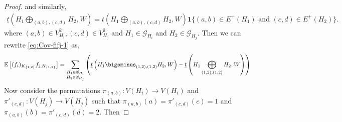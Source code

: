 \documentclass[11pt,reqno]{amsart}
\numberwithin{equation}{section}
\theoremstyle{definition}
\begin{document}
\begin{proof}
and similarly, 
\begin{align*}
\underline{t}\left(H_{1}\bigoplus_{(a,b),(c,d)} H_{2},W\right) = 
t\left(H_{1}\bigoplus_{(a,b),(c,d)} H_{2},W \right) \bm 1\{(a,b) \in E^{+}(H_{1}) \text{ and }(c,d) \in E^{+}(H_{2})\} .
\end{align*}
where $(a,b)\in V_{H_{i}}^{2}, (c,d)\in V_{H_{j}}^{2}$ and $H_{1}\in \mathscr{G}_{H_{i}}$ and $H_{2}\in \mathscr{G}_{H_{j}}$. Then we can rewrite \eqref{eq:Cov-fifj-1} as,
\begin{align}\label{eq:Cov-lowbar}
    \mathbb{E}
    &\left[(f_{i})_{K_{\{1,2\}}}f_{j,K_{\{1,2\}}}\right] = \sum_{\substack{H_{1}\in\mathscr{G}_{H_{i}}\\ H_{2}\in\mathscr{G}_{H_{j}}}}\left(\underline{t}\left(H_{1}\bigominus_{(1,2),(1,2)}H_{2},W\right) - \underline{t}\left(H_{1}\bigoplus_{(1,2),(1,2)}H_{2},W\right)\right)
\end{align}
Now consider the permutations $\pi_{(a, b)}:V(H_{i})\rightarrow V(H_{i})$ and  $\pi'_{(c, d)}:V(H_{j})\rightarrow V(H_{j})$ such that $\pi_{(a, b)}(a) = \pi'_{(c, d)}(c) = 1$ and $\pi_{(a, b)}(b) = \pi'_{(c, d)}(d) = 2$. Then


\end{proof}
\end{document}
